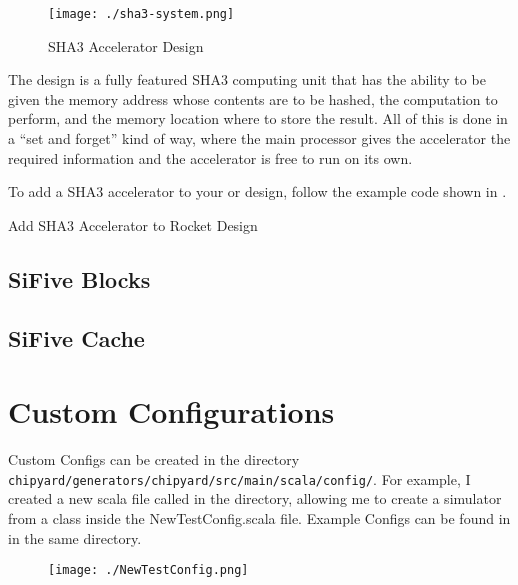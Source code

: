 \begin{figure}[h!tbp]
  \centering
  \texttt{[image: ./sha3-system.png]}
  \caption{SHA3 Accelerator Design~\cite[p.~3]{sha3Paper}}
  \label{fig:SHA3_Accelerator_Design}
\end{figure}

The design is a fully featured SHA3 computing unit that has the ability to be given the memory address whose contents are to be hashed, the computation to perform, and the memory location where to store the result.
All of this is done in a ``set and forget'' kind of way, where the main processor gives the accelerator the required information and the accelerator is free to run on its own.

To add a SHA3 accelerator to your  or  design, follow the example code shown in .

\begin{listing}[h!tbp]
\caption{Add SHA3 Accelerator to Rocket Design}
\label{lst:SHA3_Accelerator_Addition}
\end{listing}

\subsection{SiFive Blocks}\label{sec:SiFive_Blocks}
\nocite{siFiveBlocksGithub}

\subsection{SiFive Cache}\label{sec:SiFive_Cache}
\nocite{siFiveCacheGithub}

\subsection{}\label{sec:testchipip}

\section{Custom Configurations}\label{sec:Custom_Configurations}
Custom Configs can be created in the directory \texttt{chipyard/generators/chipyard/src/main/scala/config/}.
For example, I created a new scala file called  in the directory, allowing me to create a simulator from a class inside the NewTestConfig.scala file.
Example Configs can be found in   in the same directory.

\begin{figure}[h!tbp]
  \centering
  \texttt{[image: ./NewTestConfig.png]}
  \caption{}
  \label{fig:newtestconfig}
\end{figure}

